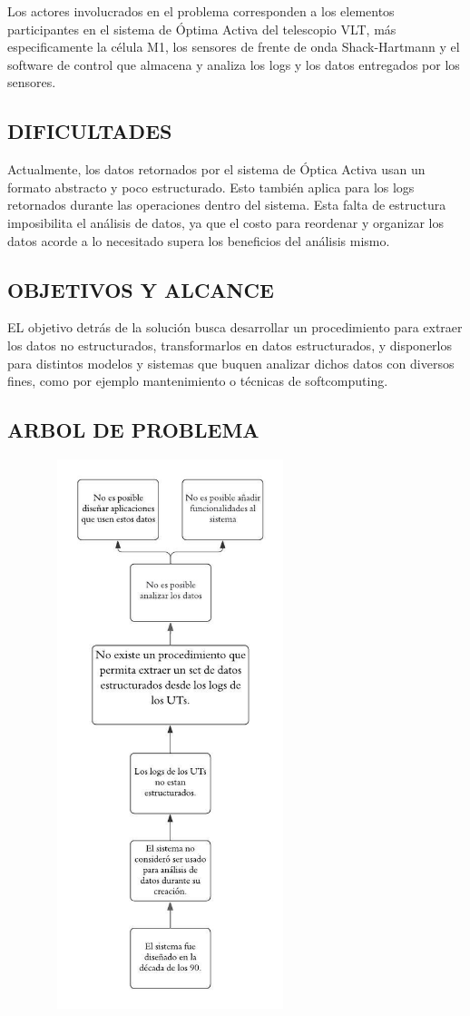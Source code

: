 Los actores involucrados en el problema corresponden a los elementos participantes en el sistema de Óptima Activa del telescopio VLT, más especificamente la célula M1, los sensores de frente de onda Shack-Hartmann y el software de control que almacena y analiza los logs y los datos entregados por los sensores\cite{eso2011vlt}.

\subsection{DIFICULTADES}

Actualmente, los datos retornados por el sistema de Óptica Activa usan un formato abstracto y poco estructurado. Esto también aplica para los logs retornados durante las operaciones dentro del sistema.
Esta falta de estructura imposibilita el análisis de datos, ya que el costo para reordenar y organizar los datos acorde a lo necesitado supera los beneficios del análisis mismo. 

\subsection{OBJETIVOS Y ALCANCE}

EL objetivo detrás de la solución busca desarrollar un procedimiento para extraer los datos no estructurados, transformarlos en datos estructurados, y disponerlos para distintos modelos y sistemas
que buquen analizar dichos datos con diversos fines, como por ejemplo mantenimiento o técnicas de softcomputing.

\subsection{ARBOL DE PROBLEMA}

\vspace{0.5cm}
\includegraphics[width=9.5cm,height=16cm]{figures/arbol_problema.jpeg} \\
\vspace{3.5cm}